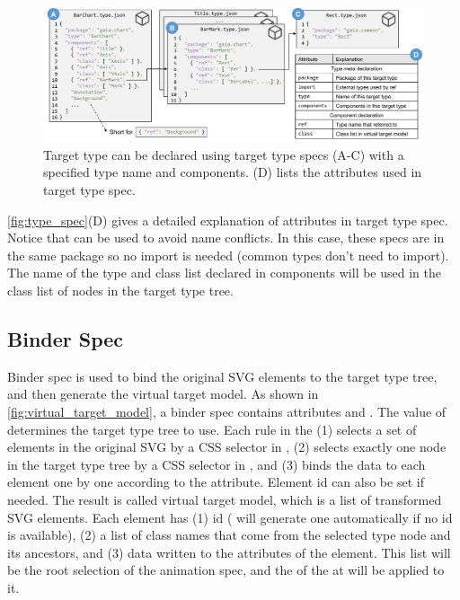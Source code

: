 \begin{figure}[h]
  \centering
  \includegraphics[width=\linewidth]{figs/target_type_spec.pdf}
  \caption{Target type can be declared using target type specs (A-C) with a specified type name and components. (D) lists the attributes used in target type spec.}
  \label{fig:type_spec}
\end{figure}

\autoref{fig:type_spec}(D) gives a detailed explanation of attributes in target type spec.
Notice that  can be used to avoid name conflicts.
In this case, these specs are in the same package so no import is needed (common types don't need to import).
The name of the type and class list declared in components will be used in the class list of nodes in the target type tree.


\subsection{Binder Spec}
\label{ssec:binder_spec}

Binder spec is used to bind the original SVG elements to the target type tree, and then generate the virtual target model.
As shown in \autoref{fig:virtual_target_model}, a binder spec contains attributes  and .
The value of  determines the target type tree to use.
Each rule in the  (1) selects a set of elements in the original SVG by a CSS selector in , (2) selects exactly one node in the target type tree by a CSS selector in , and (3) binds the data to each element one by one according to the  attribute.
Element id can also be set if needed. 
The result is called virtual target model, which is a list of transformed SVG elements.
Each element has (1) id (\gaia{} will generate one automatically if no id is available), (2) a list of class names that come from the selected type node and its ancestors, and (3) data written to the attributes of the element.
This list will be the root selection of the animation spec, and the  of the \aniunit{} at  will be applied to it.


